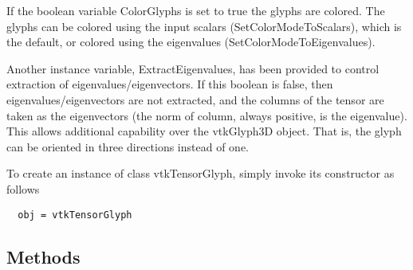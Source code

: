  If the boolean variable ColorGlyphs is set to true the glyphs are
 colored.  The glyphs can be colored using the input scalars
 (SetColorModeToScalars), which is the default, or colored using the
 eigenvalues (SetColorModeToEigenvalues).

 Another instance variable, ExtractEigenvalues, has been provided to
 control extraction of eigenvalues/eigenvectors. If this boolean is
 false, then eigenvalues/eigenvectors are not extracted, and the
 columns of the tensor are taken as the eigenvectors (the norm of
 column, always positive, is the eigenvalue).  This allows
 additional capability over the vtkGlyph3D object. That is, the
 glyph can be oriented in three directions instead of one.

To create an instance of class vtkTensorGlyph, simply
invoke its constructor as follows
\begin{verbatim}
  obj = vtkTensorGlyph
\end{verbatim}
\subsection{Methods}

